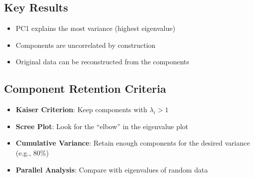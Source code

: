 \documentclass[
]{article}
\begin{document}
\begin{Shaded}
\begin{Highlighting}[]

\OperatorTok{=}\NormalTok{ np.array([[}\NormalTok{, }\NormalTok{],}
\NormalTok{              [}\NormalTok{, }\NormalTok{],}
\NormalTok{              [}\NormalTok{, }\NormalTok{]])}

\OperatorTok{=}
\OperatorTok{=}

\OperatorTok{=}
\OperatorTok{=}

\NormalTok{(}\SpecialCharTok{\{}\SpecialCharTok{\}}\NormalTok{)}
\NormalTok{(}\SpecialCharTok{\{}\NormalTok{variance\_ratio[}\NormalTok{]}\NormalTok{)}
\end{Highlighting}
\end{Shaded}

\subsection{Key Results}

\begin{itemize}
\item
  PC1 explains the most variance (highest eigenvalue)
\item
  Components are uncorrelated by construction
\item
  Original data can be reconstructed from the components
\end{itemize}

\subsection{Component Retention Criteria}

\begin{itemize}
\item
  \textbf{Kaiser Criterion}: Keep components with \(\lambda_{i} > 1\)
\item
  \textbf{Scree Plot}: Look for the ``elbow'' in the eigenvalue plot
\item
  \textbf{Cumulative Variance}: Retain enough components for the desired
  variance (e.g., 80\%)
\item
  \textbf{Parallel Analysis}: Compare with eigenvalues of random data
\end{itemize}
\end{document}
